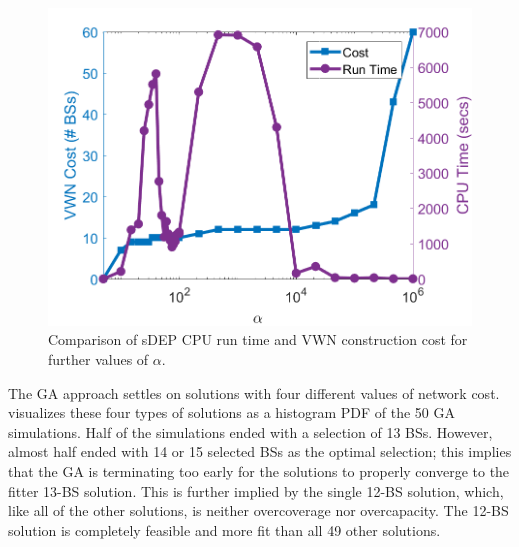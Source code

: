 \documentclass[12pt,dvipsnames]{report}
\begin{document}
\begin{figure}[tp]
	\centering
	\includegraphics[height=0.4\textheight]{Figures/Prelim_O25sDEPComparisonCostRunTimeExpandedAlpha}
	\caption[Expanded preliminary simulation comparison of sDEP run time and cost]{Comparison of sDEP CPU run time and VWN construction cost for further values of $\alpha$.}
	\label{fig:Prelim_sDEPCompCostRunTimeExpanded}
\end{figure}

The GA approach settles on solutions with four different values of network cost.   visualizes these four types of solutions as a histogram PDF of the 50 GA simulations.  Half of the simulations ended with a selection of 13 BSs.  However, almost half ended with 14 or 15 selected BSs as the optimal selection; this implies that the GA is terminating too early for the solutions to properly converge to the fitter 13-BS solution.  This is further implied by the single 12-BS solution, which, like all of the other solutions, is neither overcoverage nor overcapacity.  The 12-BS solution is completely feasible and more fit than all 49 other solutions.
\end{document}
